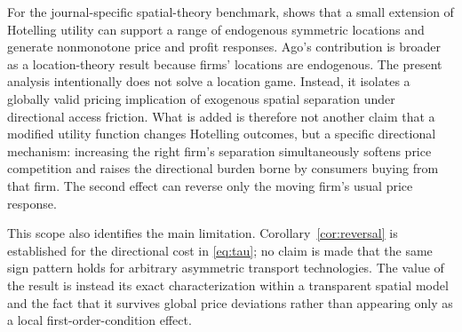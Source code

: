 For the journal-specific spatial-theory benchmark, \citet{Ago2023} shows that a small extension of Hotelling utility can support a range of endogenous symmetric locations and generate nonmonotone price and profit responses. Ago's contribution is broader as a location-theory result because firms' locations are endogenous. The present analysis intentionally does not solve a location game. Instead, it isolates a globally valid pricing implication of exogenous spatial separation under directional access friction. What is added is therefore not another claim that a modified utility function changes Hotelling outcomes, but a specific directional mechanism: increasing the right firm's separation simultaneously softens price competition and raises the directional burden borne by consumers buying from that firm. The second effect can reverse only the moving firm's usual price response.

This scope also identifies the main limitation. Corollary~\ref{cor:reversal} is established for the directional cost in \eqref{eq:tau}; no claim is made that the same sign pattern holds for arbitrary asymmetric transport technologies. The value of the result is instead its exact characterization within a transparent spatial model and the fact that it survives global price deviations rather than appearing only as a local first-order-condition effect.